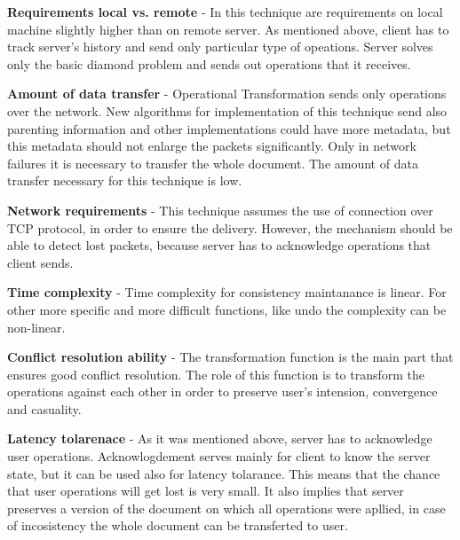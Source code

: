 \documentclass[12pt,oneside]{fithesis2}
\begin{document}
\vspace{3mm}

\textbf{Requirements local vs. remote} - In this technique are requirements on local machine slightly higher than on remote server. As mentioned above, client has to track server's history and send only particular type of opeations. Server solves only the basic diamond problem and sends out operations that it receives.

\vspace{3mm}

\textbf{Amount of data transfer} - Operational Transformation sends only operations over the network. New algorithms for implementation of this technique send also parenting information and other implementations could have more metadata, but this metadata should not enlarge the packets significantly. Only in network failures it is necessary to transfer the whole document. The amount of data transfer necessary for this technique is low.

\vspace{3mm}

\textbf{Network requirements} - This technique assumes the use of connection over TCP protocol\cite{Jupiter}\cite{simplified}, in order to ensure the delivery. However, the mechanism should be able to detect lost packets, because server has to acknowledge operations that client sends. 

\vspace{3mm}

\textbf{Time complexity} - Time complexity for consistency maintanance is linear.\cite{sequence}\cite{orthogonal} For other more specific and more difficult functions, like undo the complexity can be non-linear.

\vspace{3mm}

\textbf{Conflict resolution ability} - The transformation function is the main part that ensures good conflict resolution. The role of this function is to transform the operations against each other in order to preserve user's intension, convergence and casuality.

\vspace{3mm}

\textbf{Latency tolarenace} - As it was mentioned above, server has to acknowledge user operations. Acknowlogdement serves mainly for client to know the server state, but it can be used also for latency tolarance. This means that the chance that user operations will get lost is very small. It also implies that server preserves a version of the document on which all operations were apllied, in case of incosistency the whole document can be transferted to user.
\end{document}
